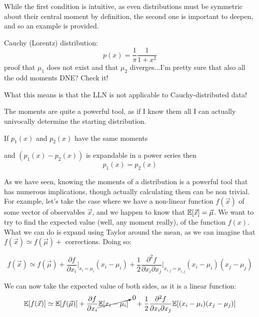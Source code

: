 While the first condition is intuitive, as even distributions must be symmetric about their central moment by definition, the second one is important to deepen, and so an example is provided.

\begin{example}
	Cauchy (Lorentz) distribution:
	\[
	p(x) = \frac{1}{\pi} \frac{1}{1+x^2}
	\]
	proof that $\mu_1$ does not exist and that $\mu_2$ diverges...I'm pretty sure that also all the odd moments DNE? Check it!
	
	What this means is that the LLN is not applicable to Cauchy-distributed data!
\end{example}

The moments are quite a powerful tool, as if I know them all I can actually univocally determine the starting distribution.
\begin{theorem}
	If $p_1(x)$ and $p_2(x)$ have the same moments 
	
	and $\left(p_1(x)-p_2(x)\right)$ is expandable in a power series then 
	\[
	p_1(x) = p_2(x)
	\]
\end{theorem}

As we have seen, knowing the moments of a distribution is a powerful tool that has numerous implications, though actually calculating them can be non trivial. For example, let's take the case where we have a non-linear function $f(\vec{x})$ of some vector of observables $\vec{x}$, and we happen to know that $\mathbb{E}[\vec{x}]=\vec\mu$. We want to try to find the expected value (well, any moment really), of the function $f(x)$. What we can do is expand using Taylor around the mean, as we can imagine that $f(\vec{x}) \simeq f(\vec\mu) +$ corrections. Doing so:

	\[
	f(\vec{x}) \simeq f(\vec{\mu}) + \frac{\partial f}{\partial x_i}\bigg\vert_{x_i = \mu_i}(x_i-\mu_i)+\frac{1}{2}\frac{\partial^2f}{\partial x_i \partial x_j}\bigg\vert_{x_{i,j} = \mu_{i,j}}(x_i-\mu_i)(x_j-\mu_j)
	\]
	
We can now take the expected value of both sides, as it is a linear function:
	\[
	\mathbb{E}[f(\vec{x})] \simeq \mathbb{E}[f(\vec{\mu})] + \frac{\partial f}{\partial x_i}\cancelto{0}{\mathbb{E}[x_i-\mu_i]} \quad + \frac{1}{2}\frac{\partial^2f}{\partial x_i \partial x_j}\mathbb{E}[(x_i-\mu_i)(x_j-\mu_j)]
	\]

